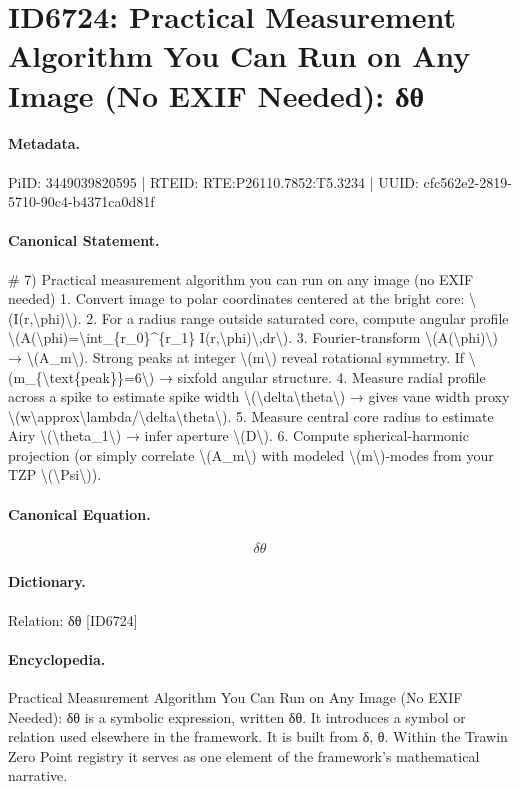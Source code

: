 \section*{ID6724: Practical Measurement Algorithm You Can Run on Any Image (No EXIF Needed): δθ}
\paragraph{Metadata.}
PiID: 3449039820595 | RTEID: RTE:P26110.7852:T5.3234 | UUID: cfc562e2-2819-5710-90c4-b4371ca0d81f

\paragraph{Canonical Statement.}
\# 7) Practical measurement algorithm you can run on any image (no EXIF needed) 1. Convert image to polar coordinates centered at the bright core: \textbackslash{}(I(r,\textbackslash{}phi)\textbackslash{}). 2. For a radius range outside saturated core, compute angular profile \textbackslash{}(A(\textbackslash{}phi)=\textbackslash{}int\_\{r\_0\}\textasciicircum{}\{r\_1\} I(r,\textbackslash{}phi)\textbackslash{},dr\textbackslash{}). 3. Fourier-transform \textbackslash{}(A(\textbackslash{}phi)\textbackslash{}) → \textbackslash{}(A\_m\textbackslash{}). Strong peaks at integer \textbackslash{}(m\textbackslash{}) reveal rotational symmetry. If \textbackslash{}(m\_\{\textbackslash{}text\{peak\}\}=6\textbackslash{}) → sixfold angular structure. 4. Measure radial profile across a spike to estimate spike width \textbackslash{}(\textbackslash{}delta\textbackslash{}theta\textbackslash{}) → gives vane width proxy \textbackslash{}(w\textbackslash{}approx\textbackslash{}lambda/\textbackslash{}delta\textbackslash{}theta\textbackslash{}). 5. Measure central core radius to estimate Airy \textbackslash{}(\textbackslash{}theta\_1\textbackslash{}) → infer aperture \textbackslash{}(D\textbackslash{}). 6. Compute spherical-harmonic projection (or simply correlate \textbackslash{}(A\_m\textbackslash{}) with modeled \textbackslash{}(m\textbackslash{})-modes from your TZP \textbackslash{}(\textbackslash{}Psi\textbackslash{})).

\paragraph{Canonical Equation.}
\[
\delta\theta
\]

\paragraph{Dictionary.}
Relation: δθ [ID6724]

\paragraph{Encyclopedia.}
Practical Measurement Algorithm You Can Run on Any Image (No EXIF Needed): δθ is a symbolic expression, written δθ. It introduces a symbol or relation used elsewhere in the framework. It is built from δ, θ. Within the Trawin Zero Point registry it serves as one element of the framework's mathematical narrative.
